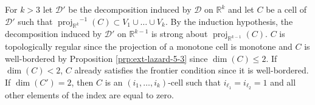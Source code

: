 \documentclass[
]{book}
\theoremstyle{definition}
\theoremstyle{definition}
\theoremstyle{definition}
\theoremstyle{definition}
\theoremstyle{remark}
\begin{document}
For \(k>3\) let \(\mathcal{D'}\) be the decomposition induced by \(\mathcal{D}\) on \(\mathbb{R}^k\) and let \(C\) be a cell of \(\mathcal{D'}\) such that \({\operatorname{proj}_{\mathbb{R}^{k}}}^{-1}(C) \subset V_1 \cup \ldots \cup V_k\).
By the induction hypothesis, the decomposition induced by \(\mathcal{D'}\) on \(\mathbb{R}^{k-1}\) is strong about \({\operatorname{proj}_{\mathbb{R}^{k-1}}}(C)\).
\(C\) is topologically regular since the projection of a monotone cell is monotone and \(C\) is well-bordered by Proposition \ref{prp:ext-lazard-5-3} since \(\dim(C) \le 2\).
If \(\dim(C) < 2\), \(C\) already satisfies the frontier condition since it is well-bordered.
If \(\dim(C') = 2\), then \(C\) is an \((i_1,\ldots,i_k)\)-cell such that \(i_{\ell_1} = i_{\ell_2} = 1\) and all other elements of the index are equal to zero.
\end{document}
